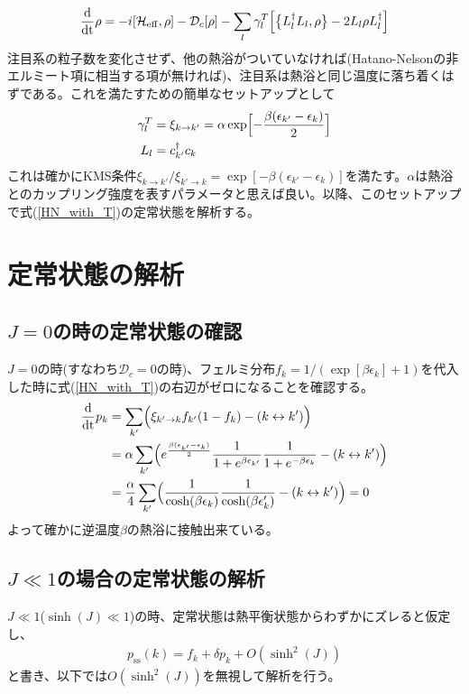 \documentclass[dvipdfmx,autodetect-engine]{jsarticle}
\newcommand{\da}{\dagger}
\newcommand{\m}[1]{\mathcal{#1}}
\newcommand{\mr}[1]{\mathrm{#1}}
\newcommand{\dt}{\frac{\mr{d}}{\mr{dt}}}
\newcommand{\bv}[1]{\Bigl(#1\Bigr)}
\newcommand{\bg}[1]{\Bigl[#1\Bigr]}
\begin{document}
\begin{align}
    \dt \rho = -i[\m{H}_{\mr{eff}}, \rho] - \m{D}_c[\rho] - \sum_l \gamma^T_l \Bigl[\bigl\{L_l^\da L_l, \rho\bigr\}-2L_l\rho L_l^\da\Bigr]\label{HN_with_T}
\end{align}
注目系の粒子数を変化させず、他の熱浴がついていなければ(Hatano-Nelsonの非エルミート項に相当する項が無ければ)、注目系は熱浴と同じ温度に落ち着くはずである。これを満たすための簡単なセットアップとして
\begin{align}
    \gamma^T_l &= \xi_{k\rightarrow k'} = \alpha \exp\bg{-\frac{\beta(\epsilon_{k'} - \epsilon_k)}{2}}\\
    L_l &= c^{\da}_{k'}c_k 
\end{align}
これは確かにKMS条件$\xi_{k \rightarrow k'}/\xi_{k'\rightarrow k} = \exp[-\beta(\epsilon_{k'}-\epsilon_k)]$を満たす。$\alpha$は熱浴とのカップリング強度を表すパラメータと思えば良い。以降、このセットアップで式(\ref{HN_with_T})の定常状態を解析する。

\section{定常状態の解析}
\subsection{$J=0$の時の定常状態の確認}
$J=0$の時(すなわち$\m{D}_c = 0$の時)、フェルミ分布$f_k = 1/(\exp[\beta\epsilon_k]+1)$を代入した時に式(\ref{HN_with_T})の右辺がゼロになることを確認する。
\begin{align}
  \dt p_k &= \sum_{k'}\bv{\xi_{k'\rightarrow k}f_{k'}(1-f_k) - (k \leftrightarrow k')}\\
  &= \alpha\sum_{k'}\bv{e^{\frac{\beta(\epsilon_{k'}-\epsilon_k)}{2}}\frac{1}{1+e^{\beta\epsilon_{k'}}}\frac{1}{1+e^{-\beta\epsilon_{k}}} - (k \leftrightarrow k')}\\
  &= \frac{\alpha}{4}\sum_{k'}\bv{\frac{1}{\cosh(\beta\epsilon_k)}\frac{1}{\cosh(\beta\epsilon_k')}- (k \leftrightarrow k')} = 0
\end{align}
よって確かに逆温度$\beta$の熱浴に接触出来ている。

\subsection{$J \ll 1$の場合の定常状態の解析}
$J \ll 1$($\sinh(J) \ll 1$)の時、定常状態は熱平衡状態からわずかにズレると仮定し、
\begin{align}
  p_{\mr{ss}}(k) = f_k + \delta p_k + O(\sinh^2(J))\label{pss_Jsmall}
\end{align}
と書き、以下では$O(\sinh^2(J))$を無視して解析を行う。
\end{document}

